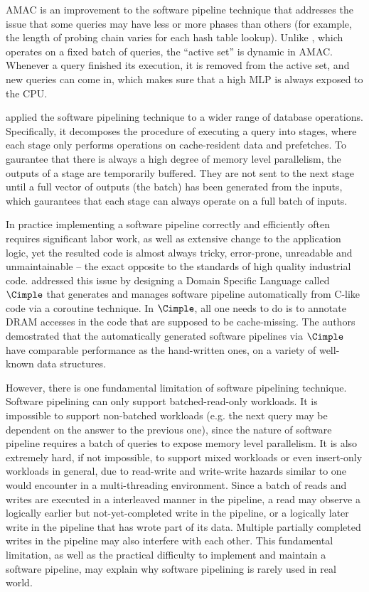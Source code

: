 \documentclass[11pt, usletter]{article}
\begin{document}
AMAC \cite{amac_vldb15} is an improvement to the software pipeline technique 
that addresses the issue that some queries may have less or more phases than others 
(for example, the length of probing chain varies for each hash table lookup). 
Unlike \cite{hashjoin_icde04}, which operates on a fixed batch of queries, the ``active set'' is dynamic in AMAC. 
Whenever a query finished its execution, it is removed from the active set, and new queries can come in, 
which makes sure that a high MLP is always exposed to the CPU.

\cite{operatorfusion_vldb17} applied the software pipelining technique to a wider range of database operations. 
Specifically, it decomposes the procedure of executing a query into stages, 
where each stage only performs operations on cache-resident data and prefetches. 
To gaurantee that there is always a high degree of memory level parallelism, the outputs of a stage are temporarily buffered. 
They are not sent to the next stage until a full vector of outputs (the batch) has been generated from the inputs, 
which gaurantees that each stage can always operate on a full batch of inputs.

In practice implementing a software pipeline correctly and efficiently 
often requires significant labor work, as well as extensive change to the application logic, 
yet the resulted code is almost always tricky, error-prone, unreadable and unmaintainable -- 
the exact opposite to the standards of high quality industrial code. 
\cite{cimple_pact18} addressed this issue by
designing a Domain Specific Language called $\Cimple$ that generates and manages software pipeline automatically from C-like code
via a coroutine technique. 
In $\Cimple$, all one needs to do is to annotate
DRAM accesses in the code that are supposed to be cache-missing.
The authors demostrated that the automatically generated software pipelines via $\Cimple$ have comparable performance as the hand-written ones, 
on a variety of well-known data structures.

However, there is one fundamental limitation of software pipelining technique. 
Software pipelining can only support batched-read-only workloads. 
It is impossible to support non-batched workloads (e.g. the next query may be dependent on the answer to the previous one), 
since the nature of software pipeline requires a batch of queries to expose memory level parallelism. 
It is also extremely hard, if not impossible, to support mixed workloads or even insert-only workloads in general, 
due to read-write and write-write hazards similar to one would encounter in a multi-threading environment.
Since a batch of reads and writes are executed in a interleaved manner in the pipeline,
a read may observe a logically earlier but not-yet-completed write in the pipeline, 
or a logically later write in the pipeline that has wrote part of its data.
Multiple partially completed writes in the pipeline may also interfere with each other.
This fundamental limitation, 
as well as the practical difficulty to implement and maintain a software pipeline, 
may explain why software pipelining is rarely used in real world.
\end{document}
